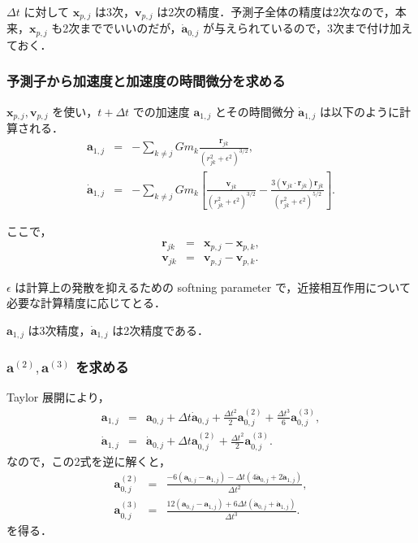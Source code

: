 \documentclass[11pt,a4paper,oneside,onecolumn]{jreport}
\begin{document}
$\Delta t$ に対して ${\bm x}_{p,j}$ は3次，${\bm v}_{p,j}$ は2次の精度．予測子全体の精度は2次なので，本来，${\bm x}_{p,j}$ も2次まででいいのだが，$\dot{{\bm a}}_{0,j}$ が与えられているので，3次まで付け加えておく．

\subsubsection{予測子から加速度と加速度の時間微分を求める}
${\bm x}_{p,j}, {\bm v}_{p,j}$ を使い，$t + \Delta t$ での加速度 ${\bm a}_{1,j}$ とその時間微分 $\dot{{\bm a}}_{1,j}$ は以下のように計算される．
\begin{eqnarray}
{\bm a}_{1,j} & = & - \sum_{k \not= j} G m_k \frac{{\bm r}_{jk}}{(r_{jk}^2 + \epsilon^2)^{3/2}}, \label{eq:a1j}\\
\dot{{\bm a}}_{1,j} & = & - \sum_{k \not= j} G m_k \left[ \frac{{\bm v}_{jk}}{(r_{jk}^2 + \epsilon^2)^{3/2}} - \frac{3 ( {\bm v}_{jk} \cdot {\bm r}_{jk} ) {\bm r}_{jk} }{(r_{jk}^2 + \epsilon^2)^{5/2}} \right]. \label{eq:a2j}
\end{eqnarray}

ここで，
\begin{eqnarray}
{\bm r}_{jk} & = & {\bm x}_{p,j} - {\bm x}_{p,k}, \\
{\bm v}_{jk} & = & {\bm v}_{p,j} - {\bm v}_{p,k}. 
\end{eqnarray}

$\epsilon$ は計算上の発散を抑えるための softning parameter で，近接相互作用について必要な計算精度に応じてとる．

${\bm a}_{1,j}$ は3次精度，$\dot{{\bm a}}_{1,j}$ は2次精度である．

\subsubsection{${\bm a}^{(2)}, {\bm a}^{(3)}$ を求める}
Taylor 展開により，
\begin{eqnarray}
{\bm a}_{1,j} & = & {\bm a}_{0,j} + \Delta t \dot{{\bm a}}_{0,j} + \frac{\Delta t ^2}{2} {\bm a}_{0,j}^{(2)} + \frac{\Delta t ^3}{6} {\bm a}_{0,j}^{(3)}, \\
\dot{{\bm a}}_{1,j} & = & \dot{{\bm a}}_{0,j} + \Delta t {\bm a}_{0,j}^{(2)} + \frac{\Delta t ^2}{2} {\bm a}_{0,j}^{(3)}. 
\end{eqnarray}
なので，この2式を逆に解くと，
\begin{eqnarray}
{\bm a}_{0,j}^{(2)} & = & \frac{- 6 ({\bm a}_{0,j} - {\bm a}_{1,j}) - \Delta t (4 \dot{{\bm a}}_{0,j} + 2 \dot{{\bm a}}_{1,j})}{\Delta t ^2}, \\
{\bm a}_{0,j}^{(3)} & = & \frac{12 ({\bm a}_{0,j} - {\bm a}_{1,j}) + 6 \Delta t (\dot{{\bm a}}_{0,j} + \dot{{\bm a}}_{1,j})}{\Delta t ^3}. 
\end{eqnarray}
を得る．
\end{document}

